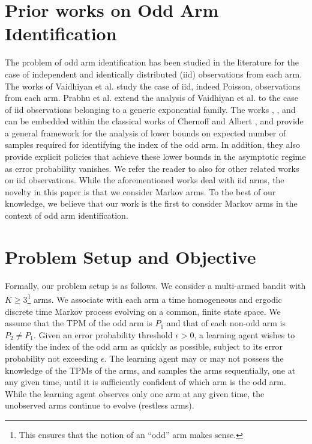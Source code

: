\section{Prior works on Odd Arm Identification}
The problem of odd arm identification has been studied in the literature for the case of independent and identically distributed (iid) observations from each arm. The works of Vaidhiyan et al. \cite{Vaidhiyan2017, vaidhiyan2012active, vaidhiyan2017learning} study the case of iid, indeed Poisson, observations from each arm. Prabhu et al. \cite{prabhu2017learning} extend the analysis of Vaidhiyan et al. to the case of iid observations belonging to a generic exponential family. The works  \cite{Vaidhiyan2017}, \cite{vaidhiyan2012active}, \cite{vaidhiyan2017learning} and \cite{prabhu2017learning}  can be embedded within the classical works of Chernoff \cite{Chernoff1959} and Albert \cite{albert1961sequential},  and provide a general framework for the analysis of lower bounds on expected number of samples required for identifying the index of the odd arm. In addition, they also provide explicit policies  that achieve these lower bounds in the asymptotic regime as error probability vanishes. We refer the reader to also \cite{kaufmann2016complexity,garivier2016optimal,hemo2016asymptotically,nitinawarat2017,naghshvar2010active,naghshvar2010information,naghshvar2011performance,naghshvar2013active} for other related works on iid observations. While the aforementioned works deal with iid arms, the novelty in this paper is that we consider Markov arms. To the best of our knowledge, we believe that our work is the first to consider Markov arms in the context of odd arm identification.

\section{Problem Setup and Objective}
Formally, our problem setup is as follows. We consider a multi-armed bandit with $K\geq 3$\footnote{This ensures that the notion of an ``odd'' arm makes sense.} arms. We associate with each arm a time homogeneous and ergodic discrete time Markov process evolving on a common, finite state space. We assume that the TPM of the odd arm is $P_{1}$ and that of each non-odd arm is $P_{2}\neq P_{1}$. Given an error probability threshold $\epsilon>0$, a learning agent wishes to identify the index of the odd arm as quickly as possible, subject to its error probability not exceeding $\epsilon$. The learning agent may or may not possess the knowledge of the TPMs of the arms, and samples the arms sequentially, one at any given time, until it is sufficiently confident of which arm is the odd arm. While the learning agent observes only one arm at any given time, the unobserved arms continue to evolve (restless arms). 

